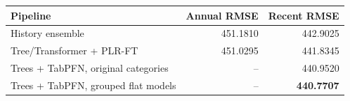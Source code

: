 \begin{tabular}{lrr}
\toprule
Pipeline & Annual RMSE & Recent RMSE \\
\midrule
History ensemble & 451.1810 & 442.9025 \\
Tree/Transformer + PLR-FT & 451.0295 & 441.8345 \\
Trees + TabPFN, original categories & -- & 440.9520 \\
Trees + TabPFN, grouped flat models & -- & \textbf{440.7707} \\
\bottomrule
\end{tabular}
